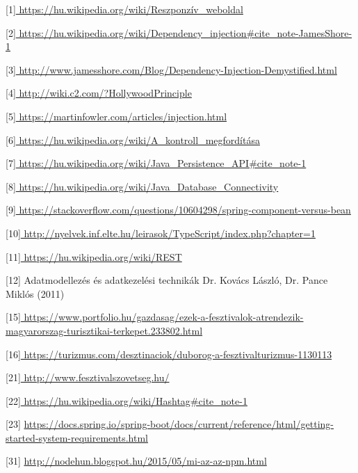 \begin{thebibliography}{x}




[1]\url{ https://hu.wikipedia.org/wiki/Reszponzív\_weboldal }

[2]\url{ https://hu.wikipedia.org/wiki/Dependency\_injection#cite_note-JamesShore-1 }	

[3]\url{ http://www.jamesshore.com/Blog/Dependency-Injection-Demystified.html }

[4]\url{ http://wiki.c2.com/?HollywoodPrinciple }

[5]\url{ https://martinfowler.com/articles/injection.html }

[6]\url{ https://hu.wikipedia.org/wiki/A_kontroll_megfordítása }

[7]\url{ https://hu.wikipedia.org/wiki/Java_Persistence_API#cite_note-1 }

[8]\url{ https://hu.wikipedia.org/wiki/Java_Database_Connectivity }

[9]\url{ https://stackoverflow.com/questions/10604298/spring-component-versus-bean }

[10]\url{ http://nyelvek.inf.elte.hu/leirasok/TypeScript/index.php?chapter=1 }

[11]\url{ https://hu.wikipedia.org/wiki/REST }

[12] Adatmodellezés és adatkezelési technikák
Dr. Kovács László, Dr. Pance Miklós (2011)

[15]\url{ https://www.portfolio.hu/gazdasag/ezek-a-fesztivalok-atrendezik-magyarorszag-turisztikai-terkepet.233802.html }

[16]\url{ https://turizmus.com/desztinaciok/duborog-a-fesztivalturizmus-1130113 }

[21]\url{ http://www.fesztivalszovetseg.hu/ }

[22]\url{ https://hu.wikipedia.org/wiki/Hashtag#cite_note-1 }

[23] \url{ https://docs.spring.io/spring-boot/docs/current/reference/html/getting-started-system-requirements.html }

[31] \url{ http://nodehun.blogspot.hu/2015/05/mi-az-az-npm.html }

\end{thebibliography}
